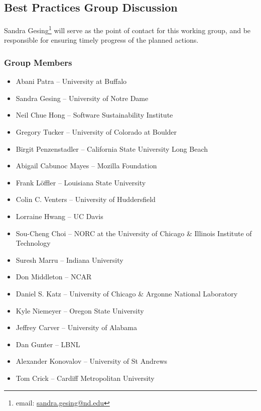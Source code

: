 \subsection{Best Practices Group Discussion}
\label{sec:appendix_best_practices}

Sandra Gesing\footnote{email:
\href{mailto:sandra.gesing@nd.edu}{sandra.gesing@nd.edu}} will serve as the
point of contact for this working group, and be responsible for ensuring timely
progress of the planned actions.

\subsubsection{Group Members}

\begin{itemize}
\item Abani Patra -- University at Buffalo
\item Sandra Gesing -- University of Notre Dame
\item Neil Chue Hong -- Software Sustainability Institute
\item Gregory Tucker -- University of Colorado at Boulder
\item Birgit Penzenstadler -- California State University Long Beach
\item Abigail Cabunoc Mayes -- Mozilla Foundation
\item Frank L\"{o}ffler -- Louisiana State University 
\item Colin C. Venters --  University of Huddersfield
\item Lorraine Hwang -- UC Davis 
\item Sou-Cheng Choi -- NORC at the University of Chicago \&  Illinois Institute of Technology
\item Suresh Marru -- Indiana University
\item Don Middleton -- NCAR 
\item Daniel S. Katz --  University of Chicago \& Argonne National Laboratory
\item Kyle Niemeyer -- Oregon State University
\item Jeffrey Carver -- University of Alabama
\item Dan Gunter -- LBNL
\item Alexander Konovalov -- University of St Andrews
\item Tom Crick --  Cardiff Metropolitan University

\end{itemize}

